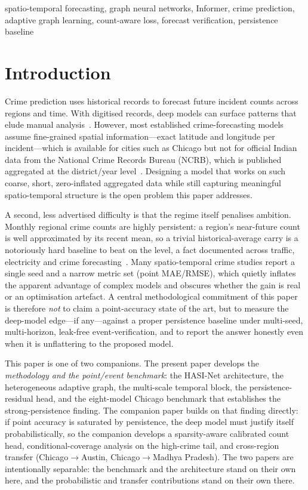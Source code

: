 \documentclass[11pt,conference]{IEEEtran}
\begin{document}
\begin{IEEEkeywords}
spatio-temporal forecasting, graph neural networks, Informer, crime
prediction, adaptive graph learning, count-aware loss, forecast
verification, persistence baseline
\end{IEEEkeywords}

\section{Introduction}\label{sec:intro}
Crime prediction uses historical records to forecast future incident counts
across regions and time. With digitised records, deep models can surface
patterns that elude manual analysis~\cite{deng2023crimerisk,fan2025informer}.
However, most established crime-forecasting models assume fine-grained
spatial information---exact latitude and longitude per incident---which is
available for cities such as Chicago but not for official Indian data from
the National Crime Records Bureau (NCRB), which is published aggregated at
the district/year level~\cite{ncrb_cii}. Designing a model that works on such
coarse, short, zero-inflated aggregated data while still capturing meaningful
spatio-temporal structure is the open problem this paper addresses.

A second, less advertised difficulty is that the regime itself penalises
ambition. Monthly regional crime counts are highly persistent: a region's
near-future count is well approximated by its recent mean, so a trivial
historical-average carry is a notoriously hard baseline to beat on the level,
a fact documented across traffic, electricity and crime
forecasting~\cite{zeng2023dlinear,bai2018tcn}. Many spatio-temporal crime
studies report a single seed and a narrow metric set (point MAE/RMSE), which
quietly inflates the apparent advantage of complex models and obscures whether
the gain is real or an optimisation artefact. A central methodological
commitment of this paper is therefore \emph{not} to claim a point-accuracy
state of the art, but to measure the deep-model edge---if any---against a
proper persistence baseline under multi-seed, multi-horizon, leak-free
event-verification, and to report the answer honestly even when it is
unflattering to the proposed model.

This paper is one of two companions. The present paper develops the
\emph{methodology and the point/event benchmark}: the HASI-Net architecture,
the heterogeneous adaptive graph, the multi-scale temporal block, the
persistence-residual head, and the eight-model Chicago benchmark that
establishes the strong-persistence finding. The companion paper builds on
that finding directly: if point accuracy is saturated by persistence, the
deep model must justify itself probabilistically, so the companion develops a
sparsity-aware calibrated count head, conditional-coverage analysis on the
high-crime tail, and cross-region transfer (Chicago$\to$Austin,
Chicago$\to$Madhya Pradesh). The two papers are intentionally separable: the
benchmark and the architecture stand on their own here, and the probabilistic
and transfer contributions stand on their own there.
\end{document}
